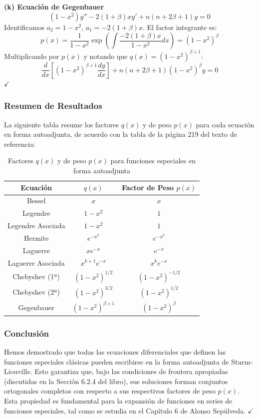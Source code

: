 \documentclass[a4paper]{article}
\begin{document}
\textbf{(k) Ecuación de Gegenbauer}
$$ (1 - x^2)y'' - 2(1+\beta)xy' + n(n+2\beta+1)y = 0 $$
Identificamos $a_2 = 1 - x^2$, $a_1 = -2(1+\beta)x$. El factor integrante es:
$$ p(x) = \frac{1}{1-x^2} \exp\left( \int \frac{-2(1+\beta)x}{1-x^2} dx \right) = (1-x^2)^{\beta} $$
Multiplicando por $p(x)$ y notando que $q(x) = (1-x^2)^{\beta+1}$:
$$ \boxed{\frac{d}{dx}\left[ (1 - x^2)^{\beta+1} \frac{dy}{dx} \right] + n(n+2\beta+1) (1 - x^2)^{\beta} y = 0} $$
$\checkmark$

\subsubsection{Resumen de Resultados}

La siguiente tabla resume los factores $q(x)$ y de peso $p(x)$ para cada ecuación en forma autoadjunta, de acuerdo con la tabla de la página 219 del texto de referencia:

\begin{table}[h]
\centering
\begin{tabular}{|c|c|c|}
\hline
\textbf{Ecuación} & \textbf{$q(x)$} & \textbf{Factor de Peso $p(x)$} \\
\hline
Bessel & $x$ & $x$ \\
\hline
Legendre & $1 - x^2$ & $1$ \\
\hline
Legendre Asociada & $1 - x^2$ & $1$ \\
\hline
Hermite & $e^{-x^2}$ & $e^{-x^2}$ \\
\hline
Laguerre & $x e^{-x}$ & $e^{-x}$ \\
\hline
Laguerre Asociada & $x^{k+1} e^{-x}$ & $x^k e^{-x}$ \\
\hline
Chebyshev (1ª) & $(1 - x^2)^{1/2}$ & $(1 - x^2)^{-1/2}$ \\
\hline
Chebyshev (2ª) & $(1 - x^2)^{3/2}$ & $(1 - x^2)^{1/2}$ \\
\hline
Gegenbauer & $(1 - x^2)^{\beta+1}$ & $(1 - x^2)^{\beta}$ \\
\hline
\end{tabular}
\caption{Factores $q(x)$ y de peso $p(x)$ para funciones especiales en forma autoadjunta}
\end{table}

\subsubsection{Conclusión}

Hemos demostrado que todas las ecuaciones diferenciales que definen las funciones especiales clásicas pueden escribirse en la forma autoadjunta de Sturm-Liouville. Esto garantiza que, bajo las condiciones de frontera apropiadas (discutidas en la Sección 6.2.4 del libro), sus soluciones forman conjuntos ortogonales completos con respecto a sus respectivos factores de peso $p(x)$. Esta propiedad es fundamental para la expansión de funciones en series de funciones especiales, tal como se estudia en el Capítulo 6 de Alonso Sepúlveda. $\checkmark$


 
\end{document}
